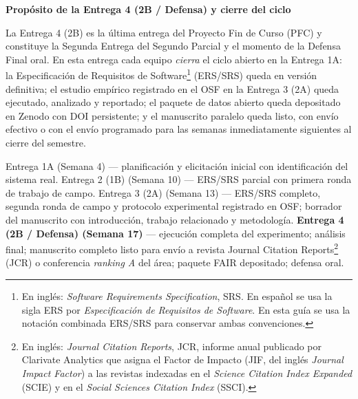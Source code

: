 \documentclass[11pt,a4paper]{article}
\newcounter{secc}
\newcommand{\secband}[1]{%
    \stepcounter{secc}\par\vspace{9pt}\noindent
    {\setlength{\fboxsep}{0pt}%
        \colorbox{uteqgold}{\parbox[c][20pt][c]{0.05\textwidth}{\centering\textbf{\color{white}\small \arabic{secc}}}}%
        \colorbox{uteqgreen}{\parbox[c][20pt][c]{0.95\textwidth}{\hspace{8pt}\textbf{\color{white}\small #1}}}%
    }\par\vspace{5pt}}
\begin{document}
\secband{Propósito de la Entrega 4 (2B / Defensa) y cierre del ciclo}

La Entrega 4 (2B) es la última entrega del Proyecto Fin de Curso (PFC) y constituye la Segunda Entrega del Segundo Parcial y el momento de la Defensa Final oral.
En esta entrega cada equipo \emph{cierra} el ciclo abierto en la Entrega 1A: la Especificación de Requisitos de Software\footnote{En inglés: \emph{Software Requirements Specification}, SRS. En español se usa la sigla ERS por \emph{Especificación de Requisitos de Software}. En esta guía se usa la notación combinada ERS/SRS para conservar ambas convenciones.} (ERS/SRS) queda en versión definitiva; el estudio empírico registrado en el OSF en la Entrega 3 (2A) queda ejecutado, analizado y reportado; el paquete de datos abierto queda depositado en Zenodo con DOI persistente; y el manuscrito paralelo queda listo, con envío efectivo o con el envío programado para las semanas inmediatamente siguientes al cierre del semestre.

\begin{notabox}[title=Continuidad narrativa con las tres entregas anteriores]
    Entrega 1A (Semana 4) --- planificación y elicitación inicial con identificación del sistema real.\newline
    Entrega 2 (1B) (Semana 10) --- ERS/SRS parcial con primera ronda de trabajo de campo.\newline
    Entrega 3 (2A) (Semana 13) --- ERS/SRS completo, segunda ronda de campo y protocolo experimental registrado en OSF; borrador del manuscrito con introducción, trabajo relacionado y metodología.\newline
    \textbf{Entrega 4 (2B / Defensa) (Semana 17)} --- ejecución completa del experimento; análisis final; manuscrito completo listo para envío a revista Journal Citation Reports\footnote{En inglés: \emph{Journal Citation Reports}, JCR, informe anual publicado por Clarivate Analytics que asigna el Factor de Impacto (JIF, del inglés \emph{Journal Impact Factor}) a las revistas indexadas en el \emph{Science Citation Index Expanded} (SCIE) y en el \emph{Social Sciences Citation Index} (SSCI).} (JCR) o conferencia \emph{ranking A} del área; paquete FAIR depositado; defensa oral.
\end{notabox}
\end{document}
